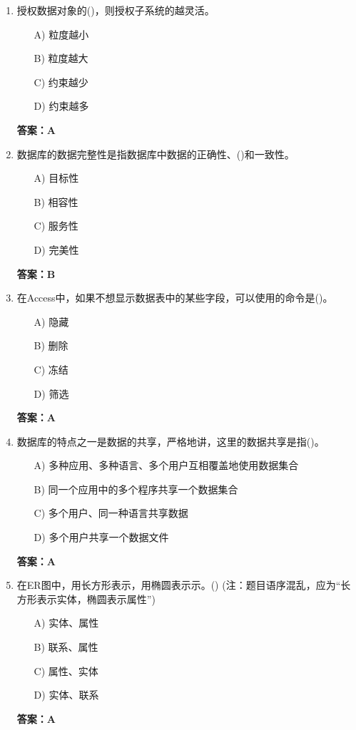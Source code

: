 \documentclass[a4paper,12pt]{article}
\begin{document}
\begin{enumerate}[label=\arabic*.]
\item 授权数据对象的()，则授权子系统的越灵活。
\begin{itemize}
    \item[A)] 粒度越小
    \item[B)] 粒度越大
    \item[C)] 约束越少
    \item[D)] 约束越多
\end{itemize}
\textbf{答案：A}

\item 数据库的数据完整性是指数据库中数据的正确性、()和一致性。
\begin{itemize}
    \item[A)] 目标性
    \item[B)] 相容性
    \item[C)] 服务性
    \item[D)] 完美性
\end{itemize}
\textbf{答案：B}

\item 在Access中，如果不想显示数据表中的某些字段，可以使用的命令是()。
\begin{itemize}
    \item[A)] 隐藏
    \item[B)] 删除
    \item[C)] 冻结
    \item[D)] 筛选
\end{itemize}
\textbf{答案：A}

\item 数据库的特点之一是数据的共享，严格地讲，这里的数据共享是指()。
\begin{itemize}
    \item[A)] 多种应用、多种语言、多个用户互相覆盖地使用数据集合
    \item[B)] 同一个应用中的多个程序共享一个数据集合
    \item[C)] 多个用户、同一种语言共享数据
    \item[D)] 多个用户共享一个数据文件
\end{itemize}
\textbf{答案：A}

\item 在ER图中，用长方形表示，用椭圆表示示。() (注：题目语序混乱，应为“长方形表示实体，椭圆表示属性”)
\begin{itemize}
    \item[A)] 实体、属性
    \item[B)] 联系、属性
    \item[C)] 属性、实体
    \item[D)] 实体、联系
\end{itemize}
\textbf{答案：A}


\end{enumerate}
\end{document}
